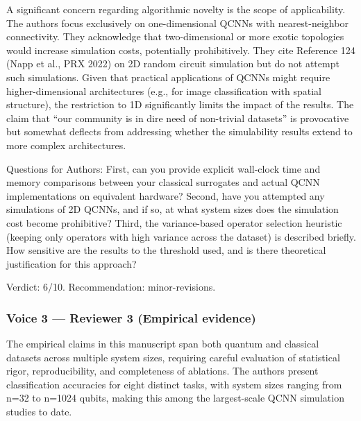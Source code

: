 \documentclass[10pt,letterpaper]{article}
\begin{document}
A significant concern regarding algorithmic novelty is the scope of applicability. The authors focus exclusively on one-dimensional QCNNs with nearest-neighbor connectivity. They acknowledge that two-dimensional or more exotic topologies would increase simulation costs, potentially prohibitively. They cite Reference 124 (Napp et al., PRX 2022) on 2D random circuit simulation but do not attempt such simulations. Given that practical applications of QCNNs might require higher-dimensional architectures (e.g., for image classification with spatial structure), the restriction to 1D significantly limits the impact of the results. The claim that ``our community is in dire need of non-trivial datasets'' is provocative but somewhat deflects from addressing whether the simulability results extend to more complex architectures.

Questions for Authors: First, can you provide explicit wall-clock time and memory comparisons between your classical surrogates and actual QCNN implementations on equivalent hardware? Second, have you attempted any simulations of 2D QCNNs, and if so, at what system sizes does the simulation cost become prohibitive? Third, the variance-based operator selection heuristic (keeping only operators with high variance across the dataset) is described briefly. How sensitive are the results to the threshold used, and is there theoretical justification for this approach?

Verdict: 6/10. Recommendation: minor-revisions.

\hypertarget{voice-3-reviewer-3-empirical-evidence}{%
\subsubsection{Voice 3 --- Reviewer 3 (Empirical evidence)}\label{voice-3-reviewer-3-empirical-evidence}}

The empirical claims in this manuscript span both quantum and classical datasets across multiple system sizes, requiring careful evaluation of statistical rigor, reproducibility, and completeness of ablations. The authors present classification accuracies for eight distinct tasks, with system sizes ranging from n=32 to n=1024 qubits, making this among the largest-scale QCNN simulation studies to date.
\end{document}
